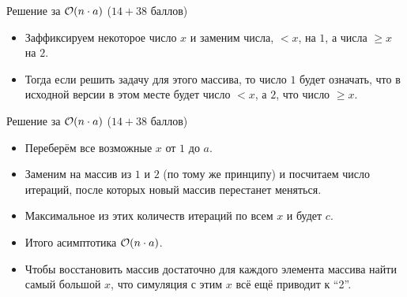 \begin{frame}{Решение за $\mathcal{O}(n \cdot a)$ ($14 + 38$ баллов)}
  \begin{itemize}
  \item Заффиксируем некоторое число $x$ и заменим числа, $< x$, на $1$, а числа $\ge x$ на $2$.
  \item Тогда если решить задачу для этого массива, то число $1$ будет означать, что в исходной версии
    в этом месте будет число $< x$, а $2$, что число $\ge x$.
  \end{itemize}
\end{frame}

\begin{frame}{Решение за $\mathcal{O}(n \cdot a)$ ($14 + 38$ баллов)}
  \begin{itemize}
  \item Переберём все возможные $x$ от $1$ до $a$.
  \item Заменим на массив из $1$ и $2$ (по тому же принципу) и посчитаем число итераций, после которых новый массив перестанет меняться.
  \item Максимальное из этих количеств итераций по всем $x$ и будет $c$.
  \item Итого асимптотика $\mathcal{O}(n \cdot a)$.
  \item Чтобы восстановить массив достаточно для каждого элемента массива найти самый большой $x$, что симуляция с этим $x$ всё ещё приводит к ``2''.
  \end{itemize}
\end{frame}


